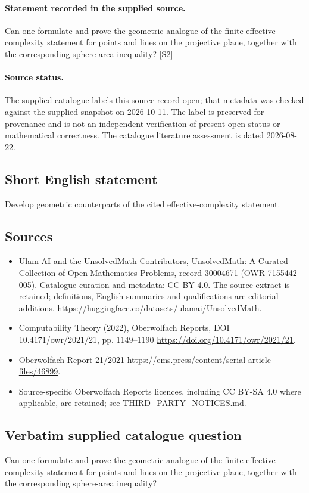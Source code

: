 \documentclass[11pt]{article}
\begin{document}
\paragraph{Statement recorded in the supplied source.}
Can one formulate and prove the geometric analogue of the finite effective-complexity statement for points and lines on the projective plane, together with the corresponding sphere-area inequality? \href{https://doi.org/10.4171/owr/2021/21}{[S2]}
\paragraph{Source status.}
The supplied catalogue labels this source record open; that metadata was checked against the supplied snapshot on 2026-10-11. The label is preserved for provenance and is not an independent verification of present open status or mathematical correctness. The catalogue literature assessment is dated 2026-08-22.
\subsection{Short English statement}
Develop geometric counterparts of the cited effective-complexity statement.
\subsection{Sources}
\begin{itemize}
\item[S1] Ulam AI and the UnsolvedMath Contributors, UnsolvedMath: A Curated Collection of Open Mathematics Problems, record 30004671 (OWR-7155442-005). Catalogue curation and metadata: CC BY 4.0. The source extract is retained; definitions, English summaries and qualifications are editorial additions.
\url{https://huggingface.co/datasets/ulamai/UnsolvedMath}.
\item[S2] Computability Theory (2022), Oberwolfach Reports, DOI 10.4171/owr/2021/21, pp. 1149--1190
\url{https://doi.org/10.4171/owr/2021/21}.
\item[S3] Oberwolfach Report 21/2021
\url{https://ems.press/content/serial-article-files/46899}.
\item Source-specific Oberwolfach Reports licences, including CC BY-SA 4.0 where applicable, are retained; see THIRD\_PARTY\_NOTICES.md.
\end{itemize}
\subsection{Verbatim supplied catalogue question}
Can one formulate and prove the geometric analogue of the finite effective-complexity statement for points and lines on the projective plane, together with the corresponding sphere-area inequality?
\end{document}
